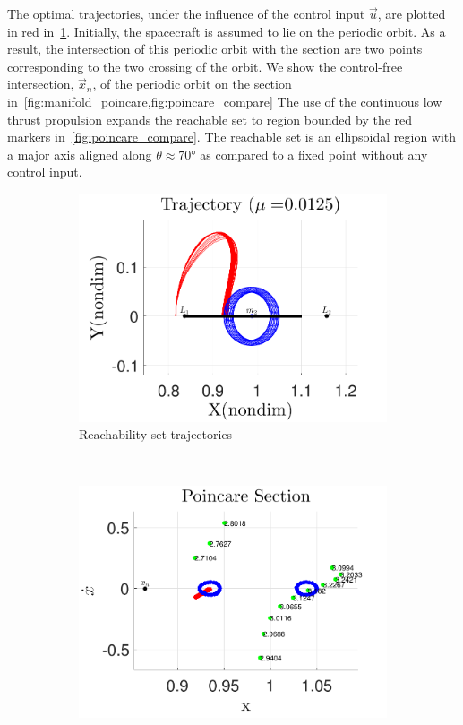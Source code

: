 \documentclass[preprint]{elsarticle}
\begin{document}
The optimal trajectories, under the influence of the control input \( \vec{u} \), are plotted in red in~\cref{fig:reach_trajectory}.
Initially, the spacecraft is assumed to lie on the periodic orbit.
As a result, the intersection of this periodic orbit with the \Poincare section are two points corresponding to the two crossing of the orbit.
We show the control-free intersection, \( \vec{x}_n \), of the periodic orbit on the \Poincare section in~\cref{fig:manifold_poincare,fig:poincare_compare}
The use of the continuous low thrust propulsion expands the reachable set to region bounded by the red markers in~\cref{fig:poincare_compare}.
The reachable set is an ellipsoidal region with a major axis aligned along \( \theta \approx \ang{70} \) as compared to a fixed point without any control input.
\begin{figure} 
	\centering 
	\begin{subfigure}[htbp]{0.5\textwidth} 
		\includegraphics[width=\textwidth]{reach_trajectory} 
		\caption{Reachability set trajectories} \label{fig:reach_trajectory} 
	\end{subfigure}~ %
	\begin{subfigure}[htbp]{0.5\textwidth} 
		\includegraphics[width=\textwidth]{poincare_compare} 

\end{subfigure}
\end{figure}
\end{document}
